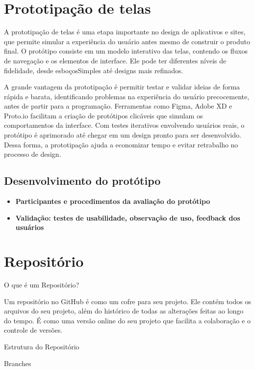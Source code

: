 \section{Prototipação de telas}

A prototipação de telas é uma etapa importante no design de aplicativos e sites, que permite simular a experiência do usuário antes mesmo de construir o produto final. O protótipo consiste em um modelo interativo das telas, contendo os fluxos de navegação e os elementos de interface. Ele pode ter diferentes níveis de fidelidade, desde esboçosSimples até designs mais refinados. 

A grande vantagem da prototipação é permitir testar e validar ideias de forma rápida e barata, identificando problemas na experiência do usuário precocemente, antes de partir para a programação. Ferramentas como Figma, Adobe XD e Proto.io facilitam a criação de protótipos clicáveis que simulam os comportamentos da interface. Com testes iterativos envolvendo usuários reais, o protótipo é aprimorado até chegar em um design pronto para ser desenvolvido. Dessa forma, a prototipação ajuda a economizar tempo e evitar retrabalho no processo de design.

\subsection{Desenvolvimento do protótipo}


\begin{itemize}
    \item \textbf{Participantes e procedimentos da avaliação do protótipo}
    \item \textbf{Validação: testes de usabilidade, observação de uso, feedback dos usuários}
    
\end{itemize}

\section{Repositório}

O que é um Repositório?

Um repositório no GitHub é como um cofre para seu projeto. Ele contém todos os arquivos do seu projeto, além do histórico de todas as alterações feitas ao longo do tempo. É como uma versão online do seu projeto que facilita a colaboração e o controle de versões.

Estrutura do Repositório

Branches


